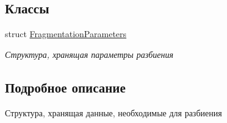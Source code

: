 \subsection*{Классы}
\begin{DoxyCompactItemize}
\item 
struct \mbox{\hyperlink{struct_fragmentation_parameters}{Fragmentation\+Parameters}}
\begin{DoxyCompactList}\small\item\em Структура, хранящая параметры разбиения \end{DoxyCompactList}\end{DoxyCompactItemize}


\subsection{Подробное описание}
Структура, хранящая данные, необходимые для разбиения 

